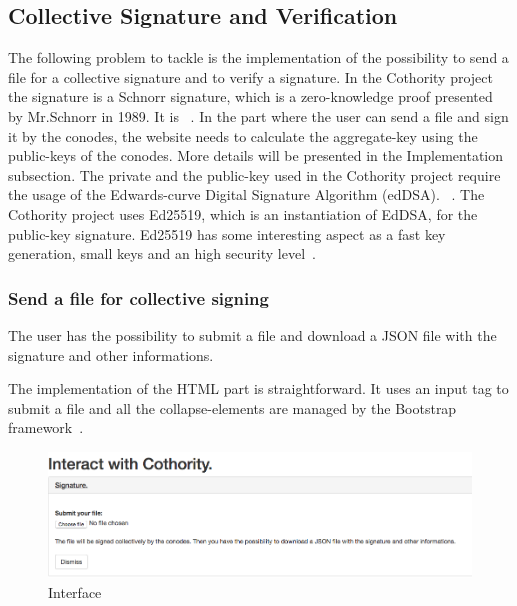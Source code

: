 \documentclass[11pt, a4paper, twoside, openright, openany]{article}
\begin{document}
\subsection{Collective Signature and Verification}
The following problem to tackle is the implementation of the possibility to send a
file for a collective signature and to verify a signature.
\newline
In the Cothority project the signature is a Schnorr signature, which is a zero-knowledge proof presented
by Mr.Schnorr in 1989. It is ~\cite{wikiSchnorr}.
\newline
In the part where the user can send a file and sign it by the conodes,
the website needs to calculate the aggregate-key using the public-keys of the conodes.
More details will be presented in the Implementation subsection.
\newline
The private and the public-key used in the Cothority project require the usage of
the Edwards-curve Digital Signature Algorithm (edDSA).
~\cite{edDSA}.
The Cothority project uses Ed25519, which is an instantiation of EdDSA, for the
public-key signature. Ed25519 has some interesting aspect as a fast key generation,
small keys and an high security level~\cite{ed25519}.
\bigbreak

\subsubsection{Send a file for collective signing}
The user has the possibility to submit a file and download a JSON file with the
signature and other informations.

The implementation of the HTML part is straightforward. It uses an input tag to
submit a file and all the collapse-elements are managed by the Bootstrap framework~\cite{bootstrap}.
\bigbreak

\begin{figure}[ht!]
\centering
\includegraphics[width=125mm]{verification_signature.jpg}
\caption{Interface}
\end{figure}
\end{document}

